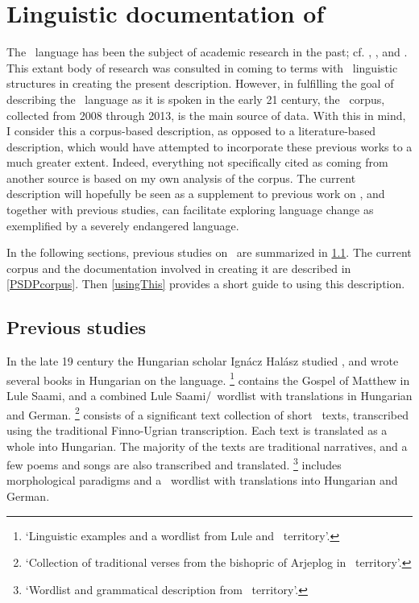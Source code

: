 \FB

\section{Linguistic documentation of \PS}\label{lingDoc}
The \PS\ language has been the subject of academic research in the past; cf. \citet{Halasz1896}, \citet{Lagercrantz1926}, \citet{Ruong1943} and \citet{Lehtiranta1992}. %
This extant body of research was consulted in coming to terms with \PS\ linguistic structures in creating the present description. 
However, in fulfilling the goal of describing the \PS\ language as it is spoken in the early 21 century, the \PSDP\ corpus, collected from 2008 through 2013, is the main source of data. With this in mind, I consider this a corpus-based description, as opposed to a literature-based description, which would have attempted to incorporate these previous works to a much greater extent. Indeed, everything not specifically cited as coming from another source is based on my own analysis of the corpus. 
The current description will hopefully be seen as a supplement to previous work on \PS, and together with previous studies, can facilitate exploring language change as exemplified by a severely endangered language. 

In the following sections, previous studies on \PS\ are summarized in \SEC\ref{previousWork}. The current corpus and the documentation involved in creating it are described in \SEC\ref{PSDPcorpus}. Then \SEC\ref{usingThis} provides a short guide to using this description. 

\subsection{Previous studies}\label{previousWork}
In the late 19 century the Hungarian scholar Ignácz Halász studied \PS, and wrote several books in Hungarian on the language. 
\footnote{‘Linguistic examples and a wordlist from Lule and \PS\ territory’.} \citep{Halasz1885} contains the Gospel of Matthew in Lule Saami, and a combined Lule Saami/\PS\ wordlist with translations in Hungarian and German. 
\footnote{‘Collection of traditional verses from the bishopric of Arjeplog in \PS\ territory’.} \citep{Halasz1893} 
consists of a significant text collection of short \PS\ texts, transcribed using the traditional Finno-Ugrian transcription. Each text is translated as a whole into Hungarian. The majority of the texts are traditional narratives, %
and a few poems and songs are also transcribed and translated. 
\footnote{‘Wordlist and grammatical description from \PS\ territory’.} \citep{Halasz1896} 
includes morphological paradigms and a \PS\ wordlist with translations into Hungarian and German. 


